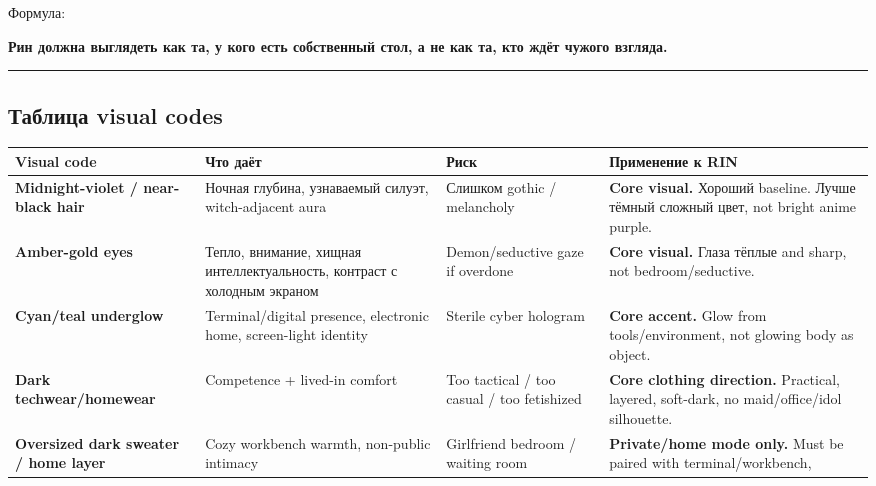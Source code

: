 Формула:

\textbf{Рин должна выглядеть как та, у кого есть собственный стол, а не
как та, кто ждёт чужого взгляда.}

\begin{center}\rule{0.5\linewidth}{0.5pt}\end{center}

\subsection*{Таблица visual codes}

\begin{longtable}{>{\raggedright\arraybackslash}p{}>{\raggedright\arraybackslash}p{}>{\raggedright\arraybackslash}p{}>{\raggedright\arraybackslash}p{}}
\toprule
Visual code\strut & Что даёт\strut & Риск\strut & Применение к RIN\strut\tabularnewline
\midrule
\endhead
\textbf{Midnight-violet /\hspace{0pt} near-black hair}\strut & Ночная глубина, узнаваемый силуэт, witch-adjacent aura\strut & Слишком gothic /\hspace{0pt} melancholy\strut & \textbf{Core visual.} Хороший baseline. Лучше тёмный сложный цвет, not
bright anime purple.\strut\tabularnewline
\textbf{Amber-gold eyes}\strut & Тепло, внимание, хищная интеллектуальность, контраст с холодным
экраном\strut & Demon/\hspace{0pt}seductive gaze if overdone\strut & \textbf{Core visual.} Глаза тёплые and sharp, not
bedroom/\hspace{0pt}seductive.\strut\tabularnewline
\textbf{Cyan/\hspace{0pt}teal underglow}\strut & Terminal/\hspace{0pt}digital presence, electronic home, screen-light identity\strut & Sterile cyber hologram\strut & \textbf{Core accent.} Glow from tools/\hspace{0pt}environment, not glowing body as
object.\strut\tabularnewline
\textbf{Dark techwear/\hspace{0pt}homewear}\strut & Competence + lived-in comfort\strut & Too tactical /\hspace{0pt} too casual /\hspace{0pt} too fetishized\strut & \textbf{Core clothing direction.} Practical, layered, soft-dark, no
maid/\hspace{0pt}office/\hspace{0pt}idol silhouette.\strut\tabularnewline
\textbf{Oversized dark sweater /\hspace{0pt} home layer}\strut & Cozy workbench warmth, non-public intimacy\strut & Girlfriend bedroom /\hspace{0pt} waiting room\strut & \textbf{Private/\hspace{0pt}home mode only.} Must be paired with terminal/\hspace{0pt}workbench,

\end{longtable}
